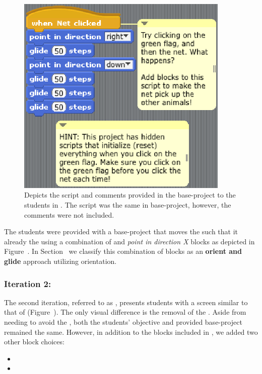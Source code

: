 \begin{figure}[!t]
\centering
\includegraphics[width=4.0in]{graphs/screen_blocks.eps}
\caption{Depicts the script and comments provided in the base-project to the
  students in \stwo{}. The script was the same in  base-project,
  however, the comments were not included.}
\end{figure}

The students were provided with a base-project that moves the \net{} such that
it already  the \zebra{} using a combination of \glideDIST{} and
\emph{point in direction X} blocks as depicted in
Figure~. In Section~ we
classify this combination of blocks as an \textbf{orient and glide} approach
utilizing \abs{} orientation.

\subsubsection{Iteration 2: \stwo{}}
The second iteration, referred to as \stwo{}, presents students with a screen
similar to that of \sone{} (Figure~). The only visual
difference is the removal of the \snake{}. Aside from needing to avoid the
\snake{}, both the students' objective and provided base-project remained the
same. However, in addition to the blocks included in \sone{}, we added two
other block choices:

\begin{itemize}
\item \pointtoward{}
\item \glideto{}
\end{itemize}

